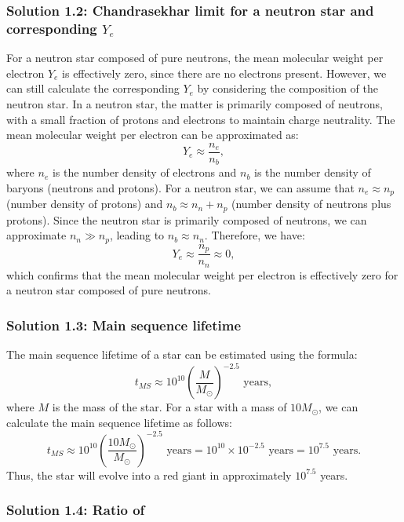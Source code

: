 \subsubsection*{Solution 1.2: Chandrasekhar limit for a neutron star and corresponding $Y_e$}
For a neutron star composed of pure neutrons, the mean molecular weight per electron $Y_e$ is effectively zero, since there are no electrons present. However, we can still calculate the corresponding $Y_e$ by considering the composition of the neutron star.
In a neutron star, the matter is primarily composed of neutrons, with a small fraction of protons and electrons to maintain charge neutrality. The mean molecular weight per electron can be approximated as:
\begin{equation}
Y_e \approx \frac{n_e}{n_b},
\end{equation}
where $n_e$ is the number density of electrons and $n_b$ is the number density of baryons (neutrons and protons). For a neutron star, we can assume that $n_e \approx n_p$ (number density of protons) and $n_b \approx n_n + n_p$ (number density of neutrons plus protons).   
Since the neutron star is primarily composed of neutrons, we can approximate $n_n \gg n_p$, leading to $n_b \approx n_n$. Therefore, we have:
\begin{equation}
Y_e \approx \frac{n_p}{n_n} \approx 0,
\end{equation}
which confirms that the mean molecular weight per electron is effectively zero for a neutron star composed of pure neutrons.

\subsubsection*{Solution 1.3: Main sequence lifetime}
The main sequence lifetime of a star can be estimated using the formula:
\begin{equation*}
t_{MS} \approx 10^{10} \left( \frac{M}{M_\odot} \right)^{-2.5} \text{ years},
\end{equation*}
where $M$ is the mass of the star. For a star with a mass of $10 M_\odot$, we can calculate the main sequence lifetime as follows:
\begin{equation*}
t_{MS} \approx 10^{10} \left( \frac{10 M_\odot}{M_\odot} \right)^{-2.5} \text{ years} = 10^{10} \times 10^{-2.5} \text{ years} = 10^{7.5} \text{ years}.
\end{equation*}
Thus, the star will evolve into a red giant in approximately $10^{7.5}$ years.

\subsubsection{Solution 1.4: Ratio of }